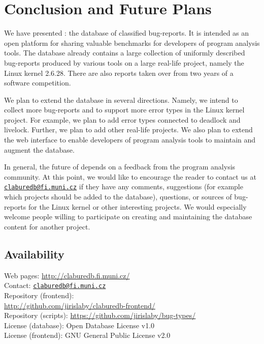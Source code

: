 
\section{Conclusion and Future Plans}\label{sec:cdb_concl}

We have presented \cdb: the database of classified bug-reports. It is
intended as an open platform for sharing valuable benchmarks for developers
of program analysis tools. The database already contains a large collection
of uniformly described bug-reports produced by various tools on a large
real-life project, namely the Linux kernel 2.6.28. There are also reports
taken over from two years of a software competition.

\medskip
We plan to extend the database in several directions. Namely, we intend to
collect more bug-reports and to support more error types in the Linux kernel
project. For example, we plan to add error types connected to deadlock and
livelock.  Further, we plan to add other real-life projects. We also plan to
extend the web interface to enable developers of program analysis tools to
maintain and augment the database.

In general, the future of \cdb depends on a feedback from the program analysis
community. At this point, we would like to encourage the reader to contact us
at \href{mailto:claburedb@fi.muni.cz}{\nolinkurl{claburedb@fi.muni.cz}} if
they have any comments, suggestions (for example which projects should be
added to the database), questions, or sources of bug-reports for the Linux
kernel or other interesting projects. We would especially welcome people
willing to participate on creating and maintaining the database content for
another project.

\subsection*{Availability}
\noindent Web pages: \url{http://claburedb.fi.muni.cz/} \\
\noindent Contact:
  \href{mailto:claburedb@fi.muni.cz}{\nolinkurl{claburedb@fi.muni.cz}} \\
\noindent Repository (frontend): \\ \indent
  \url{http://github.com/jirislaby/claburedb-frontend/} \\
\noindent Repository (scripts): \url{https://github.com/jirislaby/bug-types/} \\
\noindent License (database): Open Database License v1.0 \\
\noindent License (frontend): GNU General Public License v2.0

